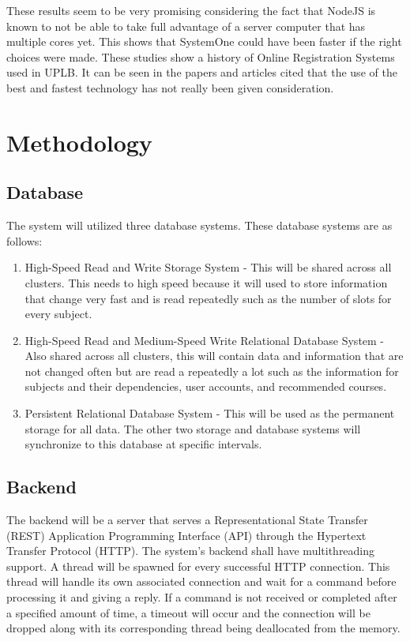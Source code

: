 \documentclass{sigchi}
\begin{document}
These results seem to be very promising considering the fact that NodeJS is known to not be
able to take full advantage of a server computer that has multiple cores yet. This shows that
SystemOne could have been faster if the right choices were made.
These studies show a history of Online Registration Systems used in UPLB. It can be seen in
the papers and articles cited that the use of the best and fastest technology has not really been
given consideration.

\section{Methodology}

\subsection{Database}

The system will utilized three database systems. These database systems are as
follows:
\begin{enumerate}
\item High-Speed Read and Write Storage System - This will be shared across all
clusters. This needs to high speed because it will used to store information
that change very fast and is read repeatedly such as the number of slots for
every subject.

\item High-Speed Read and Medium-Speed Write Relational Database System - Also 
shared across all clusters, this will contain data and information that are not
changed often but are read a repeatedly a lot such as the information for subjects
and their dependencies, user accounts, and recommended courses.

\item Persistent Relational Database System - This will be used as the permanent
storage for all data. The other two storage and database systems will synchronize
to this database at specific intervals.
\end{enumerate}



\subsection{Backend}

The backend will be a server that serves a Representational State Transfer (REST)
Application Programming Interface (API) through the Hypertext Transfer Protocol
(HTTP). The system's backend shall have multithreading support. A thread will be 
spawned for every successful HTTP connection. This thread will handle its own
associated connection and wait for a command before processing it and giving a 
reply. If a command is not received or completed after a specified amount of
time, a timeout will occur and the connection will be dropped along with its
corresponding thread being deallocated from the memory. 
\end{document}
